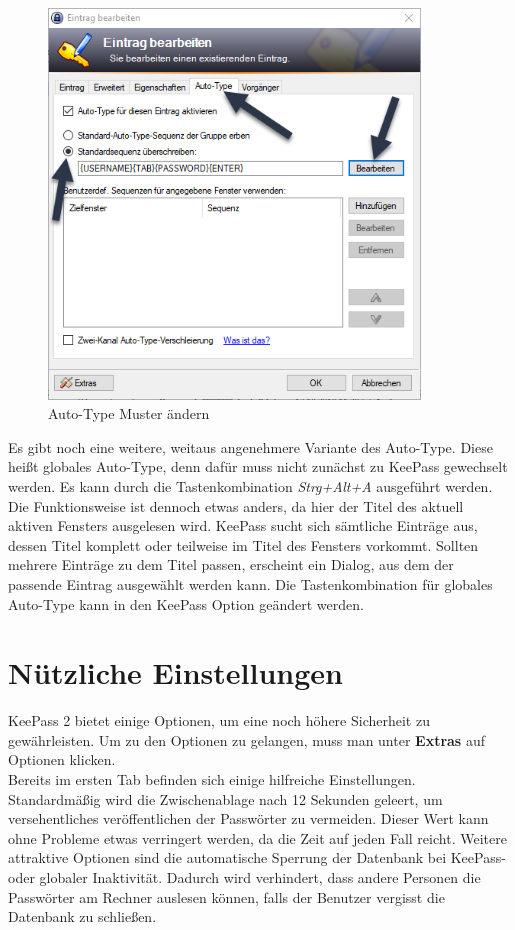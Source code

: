 \documentclass[12pt,a4paper]{scrreprt}
\begin{document}
\begin{figure}[h]
\begin{center}
\includegraphics[width=280pt]{media/kautotype.png}
\caption{Auto-Type Muster ändern}
\label{kautotype}
\end{center}
\end{figure}

\noindent Es gibt noch eine weitere, weitaus angenehmere Variante des Auto-Type. Diese heißt globales Auto-Type, denn dafür muss nicht zunächst zu KeePass gewechselt werden. Es kann durch die Tastenkombination \textit{Strg+Alt+A} ausgeführt werden. Die Funktionsweise ist dennoch etwas anders, da hier der Titel des aktuell aktiven Fensters ausgelesen wird. KeePass sucht sich sämtliche Einträge aus, dessen Titel komplett oder teilweise im Titel des Fensters vorkommt. Sollten mehrere Einträge zu dem Titel passen, erscheint ein Dialog, aus dem der passende Eintrag ausgewählt werden kann. Die Tastenkombination für globales Auto-Type kann in den KeePass Option geändert werden.

\newpage

\section{Nützliche Einstellungen}
KeePass 2 bietet einige Optionen, um eine noch höhere Sicherheit zu gewährleisten. Um zu den Optionen zu gelangen, muss man unter \textbf{Extras} auf Optionen klicken. \\

\noindent Bereits im ersten Tab befinden sich einige hilfreiche Einstellungen. Standardmäßig wird die Zwischenablage nach 12 Sekunden geleert, um versehentliches veröffentlichen der Passwörter zu vermeiden. Dieser Wert kann ohne Probleme etwas verringert werden, da die Zeit auf jeden Fall reicht. Weitere attraktive Optionen sind die automatische Sperrung der Datenbank bei KeePass- oder globaler Inaktivität. Dadurch wird verhindert, dass andere Personen die Passwörter am Rechner auslesen können, falls der Benutzer vergisst die Datenbank zu schließen.
\end{document}
